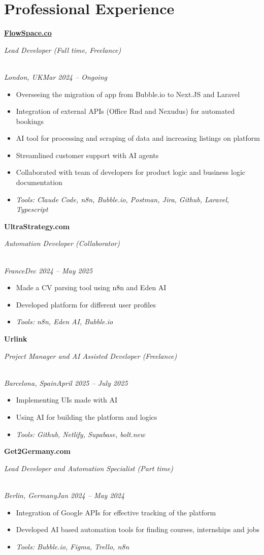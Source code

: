 \documentclass[a4paper,10pt]{article}
\newcommand{\role}[4]{\vspace{3pt}\noindent\hspace{0.6em}\parbox[t]{0.38\textwidth}{\raggedright\textbf{#1}}\hfill\parbox[t]{0.58\textwidth}{\raggedleft\textit{#2}}\\{\textit{#3}\hfill\textit{#4}}\vspace{1pt}}
\begin{document}
\section{Professional Experience}
\role{\href{https://flowspace.co}{FlowSpace.co}}{Lead Developer (Full time, Freelance)}{London, UK}{Mar 2024 -- Ongoing}
\begin{itemize}
\item Overseeing the migration of app from Bubble.io to Next.JS and Laravel
\item Integration of external APIs (Office Rnd and Nexudus) for automated bookings
\item AI tool for processing and scraping of data and increasing listings on platform
\item Streamlined customer support with AI agents
\item Collaborated with team of developers for product logic and business logic documentation
\item \textit{Tools: Claude Code, n8n, Bubble.io, Postman, Jira, Github, Laravel, Typescript}
\end{itemize}

\role{UltraStrategy.com}{Automation Developer (Collaborator)}{France}{Dec 2024 -- May 2025}
\begin{itemize}
\item Made a CV parsing tool using n8n and Eden AI
\item Developed platform for different user profiles
\item \textit{Tools: n8n, Eden AI, Bubble.io}
\end{itemize}

\role{Urlink}{Project Manager and AI Assisted Developer (Freelance)}{Barcelona, Spain}{April 2025 -- July 2025}
\begin{itemize}
\item Implementing UIs made with AI
\item Using AI for building the platform and logics
\item \textit{Tools: Github, Netlify, Supabase, bolt.new}
\end{itemize}

\role{Get2Germany.com}{Lead Developer and Automation Specialist (Part time)}{Berlin, Germany}{Jan 2024 -- May 2024}
\begin{itemize}
\item Integration of Google APIs for effective tracking of the platform
\item Developed AI based automation tools for finding courses, internships and jobs
\item \textit{Tools: Bubble.io, Figma, Trello, n8n}
\end{itemize}
\end{document}
